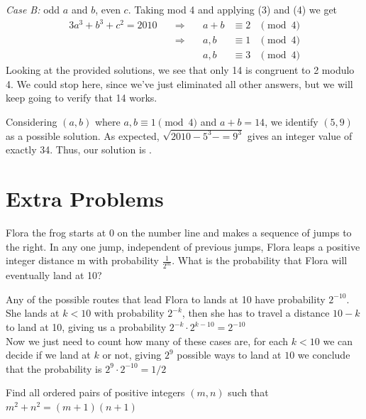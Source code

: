 \documentclass[12pt]{article}
\newcounter{problem}
\begin{document}
\begin{solution}
    \emph{Case B:} odd $a$ and $b$, even $c$. Taking mod 4 and applying (3) and (4) we get
    \begin{alignat*}{3}
        a^3 + b^3 + c^2 = 2010 \quad &\Rightarrow& \quad a + b &\equiv 2 &\pmod 4\\
        &\Rightarrow& \quad a,b &\equiv 1 &\pmod 4\\
        && \quad a,b &\equiv 3 &\pmod 4
    \end{alignat*}
    Looking at the provided solutions, we see that only 14 is congruent to 2 modulo 4. We could stop here, since we've just eliminated all other answers, but we will keep going to verify that 14 works.
    
    Considering $(a,b)$ where $a,b \equiv 1 \pmod{4}$ and $a+b=14$, we identify $(5,9)$ as a possible solution. As expected, $\sqrt{2010-5^3-=9^3}$ gives an integer value of exactly 34. Thus, our solution is .   

\end{solution}
    

\thispagestyle{fancy}
\section*{Extra Problems}

\begin{problem}[C][6][AMC 2023/12A]
   Flora the frog starts at 0 on the number line and makes a sequence of jumps to the right. In any one jump, independent of previous jumps, Flora leaps a positive integer distance m with probability $\frac{1}{2^m}$. What is the probability that Flora will eventually land at 10?
\end{problem}

\begin{solution}[1/2]
   Any of the possible routes that lead Flora to lands at 10 have probability $2^{-10}$. She lands at $k<10$ with probability $2^{-k}$, then she has to travel a distance $10-k$ to land at 10, giving us a probability $2^{-k} \cdot 2^{k-10}=2^{-10}$\\
    Now we just need to count how many of these cases are, for each $k<10$ we can decide if we land at $k$ or not, giving $2^9$ possible ways to land at $10$ we conclude that the probability is $2^9 \cdot 2^{-10} = \boxed{1/2}$
\end{solution}
    
\begin{problem}
    Find all ordered pairs of positive integers $(m,n)$ such that $m^2+n^2=(m+1)(n+1)$
\end{problem}
\end{document}
